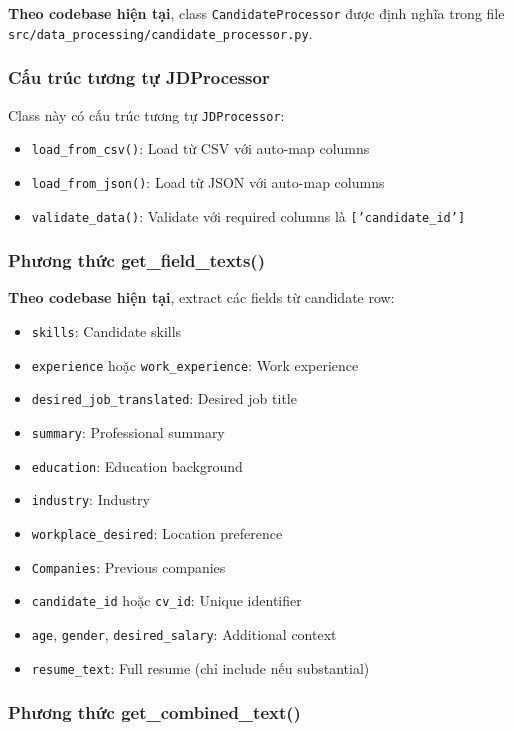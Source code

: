 \textbf{Theo codebase hiện tại}, class \texttt{CandidateProcessor} được định nghĩa trong file \texttt{src/data\_processing/candidate\_processor.py}.

\subsubsection{Cấu trúc tương tự JDProcessor}

Class này có cấu trúc tương tự \texttt{JDProcessor}:
\begin{itemize}
    \item \texttt{load\_from\_csv()}: Load từ CSV với auto-map columns
    \item \texttt{load\_from\_json()}: Load từ JSON với auto-map columns
    \item \texttt{validate\_data()}: Validate với required columns là \texttt{['candidate\_id']}
\end{itemize}

\subsubsection{Phương thức get\_field\_texts()}

\textbf{Theo codebase hiện tại}, extract các fields từ candidate row:
\begin{itemize}
    \item \texttt{skills}: Candidate skills
    \item \texttt{experience} hoặc \texttt{work\_experience}: Work experience
    \item \texttt{desired\_job\_translated}: Desired job title
    \item \texttt{summary}: Professional summary
    \item \texttt{education}: Education background
    \item \texttt{industry}: Industry
    \item \texttt{workplace\_desired}: Location preference
    \item \texttt{Companies}: Previous companies
    \item \texttt{candidate\_id} hoặc \texttt{cv\_id}: Unique identifier
    \item \texttt{age}, \texttt{gender}, \texttt{desired\_salary}: Additional context
    \item \texttt{resume\_text}: Full resume (chỉ include nếu substantial)
\end{itemize}

\subsubsection{Phương thức get\_combined\_text()}

